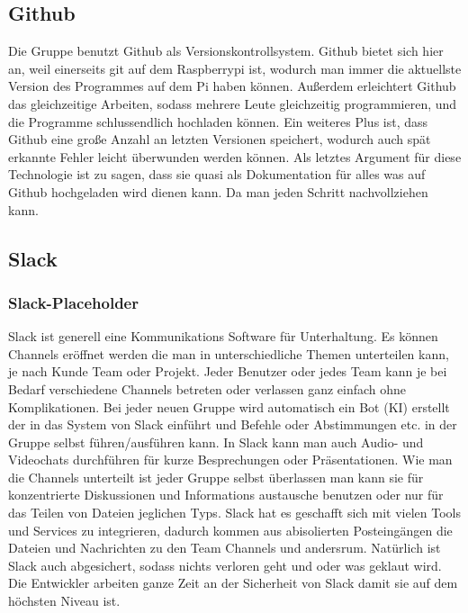\documentclass[notitlepage]{report}
\begin{document}
\subsection{Github}

Die Gruppe benutzt Github als Versionskontrollsystem. Github bietet sich hier an, weil einerseits git auf dem Raspberrypi ist, wodurch man immer die aktuellste Version des Programmes auf dem Pi haben k\"{o}nnen. Au{\ss}erdem erleichtert Github das gleichzeitige Arbeiten, sodass mehrere Leute gleichzeitig programmieren, und die Programme schlussendlich hochladen k\"{o}nnen. Ein weiteres Plus ist, dass Github eine gro{\ss}e Anzahl an letzten Versionen speichert, wodurch auch sp\"{a}t erkannte Fehler leicht \"{u}berwunden werden k\"{o}nnen. Als letztes Argument f\"{u}r diese Technologie ist zu sagen, dass sie quasi als Dokumentation f\"{u}r alles was auf Github hochgeladen wird dienen kann. Da man jeden Schritt nachvollziehen kann. 

\subsection{Slack}

\subsubsection{Slack-Placeholder}

Slack ist generell eine Kommunikations Software f\"{u}r Unterhaltung. Es k\"{o}nnen Channels er\"{o}ffnet werden die man in unterschiedliche Themen unterteilen kann, je nach Kunde Team oder Projekt. Jeder Benutzer oder jedes Team kann je bei Bedarf verschiedene Channels betreten oder verlassen ganz einfach ohne Komplikationen. Bei jeder neuen Gruppe wird automatisch ein Bot (KI) erstellt der in das System von Slack einf\"{u}hrt und Befehle oder Abstimmungen etc. in der Gruppe selbst f\"{u}hren/ausf\"{u}hren kann. In Slack kann man auch Audio- und Videochats durchf\"{u}hren f\"{u}r kurze Besprechungen oder Pr\"{a}sentationen.  Wie man die Channels unterteilt ist jeder Gruppe selbst \"{u}berlassen man kann sie f\"{u}r konzentrierte Diskussionen und Informations austausche benutzen oder nur f\"{u}r das Teilen von Dateien jeglichen Typs. Slack hat es geschafft sich mit vielen Tools und Services zu integrieren, dadurch kommen aus abisolierten Posteing\"{a}ngen die Dateien und Nachrichten zu den Team Channels und andersrum. Nat\"{u}rlich ist Slack auch abgesichert, sodass nichts verloren geht und oder was geklaut wird. Die Entwickler arbeiten ganze Zeit an der Sicherheit von Slack damit sie auf dem h\"{o}chsten Niveau ist.
\end{document}
